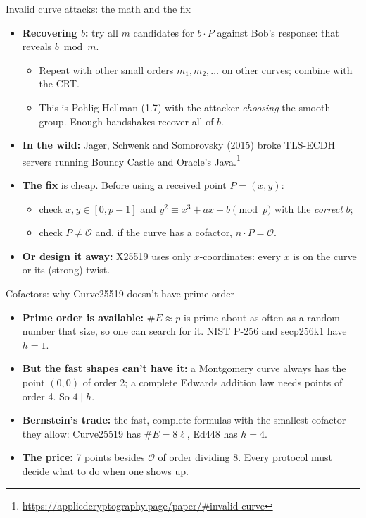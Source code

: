 \ifdefined\PRESENTATION\else\PassOptionsToClass{handout}{beamer}\fi\documentclass[aspectratio=169, lualatex]{beamer}
\begin{document}
\begin{frame}{Invalid curve attacks: the math and the fix}
	\begin{itemize}
		\item \textbf{Recovering $b$:} try all $m$ candidates for $b \cdot P$ against Bob's response: that reveals $b \bmod m$.
		      \begin{itemize}
			      \item Repeat with other small orders $m_1, m_2, \ldots$ on other curves; combine with the CRT.
			      \item This is Pohlig-Hellman (1.7) with the attacker \emph{choosing} the smooth group. Enough handshakes recover all of $b$.
		      \end{itemize}
		\item \textbf{In the wild:} Jager, Schwenk and Somorovsky (2015) broke TLS-ECDH servers running Bouncy Castle and Oracle's Java.\footnote{\url{https://appliedcryptography.page/paper/\#invalid-curve}}
		\item \textbf{The fix} is cheap. Before using a received point $P = (x, y)$:
		      \begin{itemize}
			      \item check $x, y \in [0, p-1]$ and $y^2 \equiv x^3 + ax + b \pmod{p}$ with the \emph{correct} $b$;
			      \item check $P \neq \mathcal{O}$ and, if the curve has a cofactor, $n \cdot P = \mathcal{O}$.
		      \end{itemize}
		\item \textbf{Or design it away:} X25519 uses only $x$-coordinates: every $x$ is on the curve or its (strong) twist.
	\end{itemize}
\end{frame}

\begin{frame}{Cofactors: why Curve25519 doesn't have prime order}
	\begin{itemize}
		\item \textbf{Prime order is available:} $\#E \approx p$ is prime about as often as a random number that size, so one can search for it. NIST P-256 and secp256k1 have $h = 1$.
		\item \textbf{But the fast shapes can't have it:} a Montgomery curve always has the point $(0, 0)$ of order 2; a complete Edwards addition law needs points of order 4. So $4 \mid h$.
		\item \textbf{Bernstein's trade:} the fast, complete formulas with the smallest cofactor they allow: Curve25519 has $\#E = 8\ell$, Ed448 has $h = 4$.
		\item \textbf{The price:} 7 points besides $\mathcal{O}$ of order dividing 8. Every protocol must decide what to do when one shows up.
	\end{itemize}
\end{frame}
\end{document}
